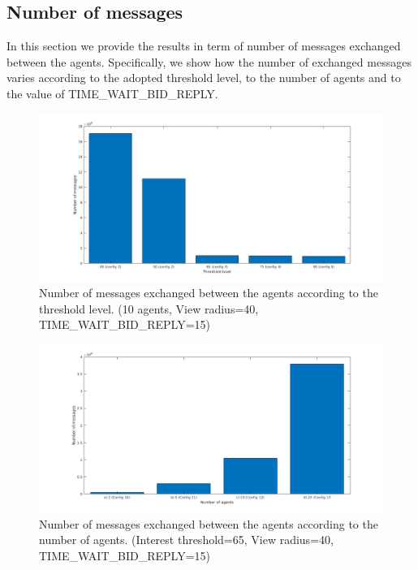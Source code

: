 \documentclass[a4paper, 10pt, conference]{ieeeconf}      %
\begin{document}
\subsection{Number of messages}
In this section we provide the results in term of number of messages exchanged between the agents. Specifically, we show how the number of exchanged messages varies according to the adopted threshold level, to the number of agents and to the value of TIME\_WAIT\_BID\_REPLY. 
\begin{figure}[H]
	\centering
	\includegraphics[width=1\linewidth]{img/threshold_messages_number.png}
	\caption{Number of messages exchanged between the agents according to the threshold level. (10 agents, View radius=40, TIME\_WAIT\_BID\_REPLY=15)}
	\label{fig:threshold-messages-number}
\end{figure}
\begin{figure}[H]
	\centering
	\includegraphics[width=1\linewidth]{img/agents_messages_number.png}
	\caption{Number of messages exchanged between the agents according to the number of agents. (Interest threshold=65, View radius=40, TIME\_WAIT\_BID\_REPLY=15)}
	\label{fig:agents-messages-number}
\end{figure}
\end{document}
